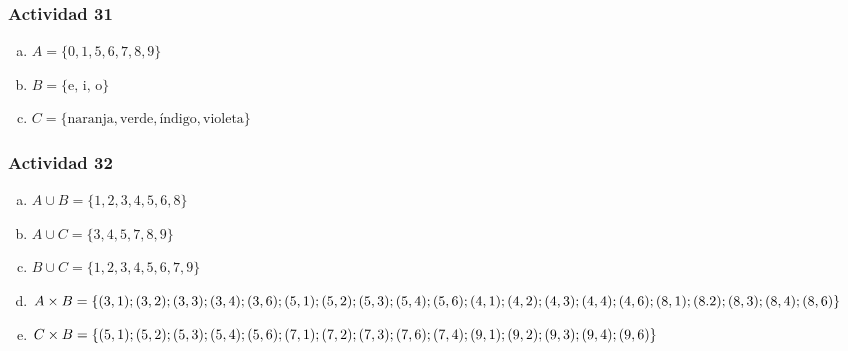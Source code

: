 \documentclass[a4paper, twocolumn]{article}
\begin{document}
\subsubsection*{Actividad 31}
\begin{enumerate}[a)]
\item $A=\{0, 1, 5, 6, 7, 8, 9\}$
\item $B=\{\mbox{e, i, o}\}$
\item $C=\{\mbox{naranja}, \mbox{verde}, \mbox{índigo}, \mbox{violeta}\}$
\end{enumerate}

\subsubsection*{Actividad 32}
\begin{enumerate}[a)]
\item $A \cup B =\{1,2,3,4,5,6,8\}$
\item $A \cup C =\{3,4,5,7,8,9\}$
\item $B \cup C =\{1,2,3,4,5,6,7,9\}$
\item $A \times B = \{(3,1) ; (3,2 ) ; (3,3 ) ; (3,4 ) ; (3,6 ) ; (5,1 ) ; (5,2 ) ;(5,3 ) ;\\
(5,4 ) ; (5,6 ) ; (4,1 ) ; (4,2 ) ; (4,3 ) ; (4,4 ) ; (4,6 ) ; (8,1 ) ; (8.2 ) ; (8,3 ) ; \\
(8,4 ) ; (8,6 )\}$
\item $C \times B = \{(5,1 ) ; (5,2 ) ; (5,3 ) ; (5,4 ) ; (5,6 ) ; (7,1 ) ; (7,2 ) ; (7,3 ) ;\\
  (7,6 ) ; (7,4 ) ;(9,1 ) ; (9,2 ) ; (9,3 ) ; (9,4 ) ;(9,6)\}$
\end{enumerate}
\end{document}
